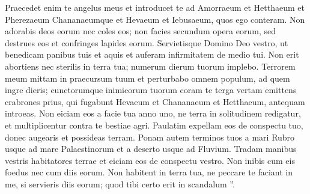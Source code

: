 \begin{biblechapter}
\begin{biblechapter}
\begin{biblechapter}
\begin{biblechapter}
\begin{biblechapter}
\begin{biblechapter}
\begin{biblechapter}
\begin{biblechapter}
\begin{biblechapter}
\begin{biblechapter}
\begin{biblechapter}
\begin{biblechapter}
\begin{biblechapter}
\begin{biblechapter}
\begin{biblechapter}
\begin{biblechapter}
\begin{biblechapter}
\begin{biblechapter}
\begin{biblechapter}
\begin{biblechapter}
\begin{biblechapter}
\begin{biblechapter}
\begin{biblechapter}
 \verse Praecedet enim te angelus meus et introducet te ad Amorraeum et Hetthaeum et Pherezaeum Chananaeumque et Hevaeum et Iebusaeum, quos ego conteram. 
\verse Non adorabis deos eorum nec coles eos; non facies secundum opera eorum, sed destrues eos et confringes lapides eorum.
 \verse Servietisque Domino Deo vestro, ut benedicam panibus tuis et aquis et auferam infirmitatem de medio tui. 
\verse Non erit abortiens nec sterilis in terra tua; numerum dierum tuorum implebo.
 \verse Terrorem meum mittam in praecursum tuum et perturbabo omnem populum, ad quem ingre dieris; cunctorumque inimicorum tuorum coram te terga vertam 
\verse emittens crabrones prius, qui fugabunt Hevaeum et Chananaeum et Hetthaeum, antequam introeas. 
\verse Non eiciam eos a facie tua anno uno, ne terra in solitudinem redigatur, et multiplicentur contra te bestiae agri. 
\verse Paulatim expellam eos de conspectu tuo, donec augearis et possideas terram. 
\verse Ponam autem terminos tuos a mari Rubro usque ad mare Palaestinorum et a deserto usque ad Fluvium. Tradam manibus vestris habitatores terrae et eiciam eos de conspectu vestro. 
\verse Non inibis cum eis foedus nec cum diis eorum. 
\verse Non habitent in terra tua, ne peccare te faciant in me, si servieris diis eorum; quod tibi certo erit in scandalum ”.
 

\end{biblechapter}
\end{biblechapter}
\end{biblechapter}
\end{biblechapter}
\end{biblechapter}
\end{biblechapter}
\end{biblechapter}
\end{biblechapter}
\end{biblechapter}
\end{biblechapter}
\end{biblechapter}
\end{biblechapter}
\end{biblechapter}
\end{biblechapter}
\end{biblechapter}
\end{biblechapter}
\end{biblechapter}
\end{biblechapter}
\end{biblechapter}
\end{biblechapter}
\end{biblechapter}
\end{biblechapter}
\end{biblechapter}
